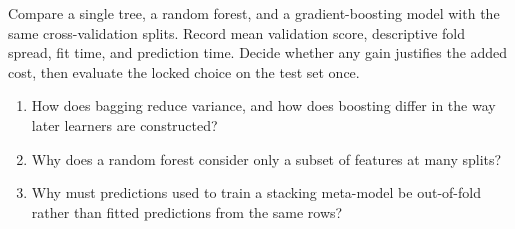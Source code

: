 \begin{tryit}
Compare a single tree, a random forest, and a gradient-boosting model with the same cross-validation splits. Record mean validation score, descriptive fold spread, fit time, and prediction time. Decide whether any gain justifies the added cost, then evaluate the locked choice on the test set once.
\end{tryit}

\begin{quickcheck}
\begin{enumerate}
  \item How does bagging reduce variance, and how does boosting differ in the way later learners are constructed?
  \item Why does a random forest consider only a subset of features at many splits?
  \item Why must predictions used to train a stacking meta-model be out-of-fold rather than fitted predictions from the same rows?
\end{enumerate}
\end{quickcheck}
